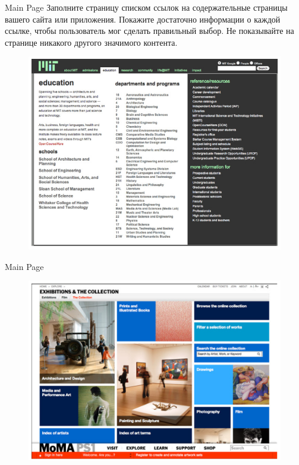 \documentclass{beamer}
\begin{document}
\begin{frame}[t]{Main Page}
	Заполните страницу списком ссылок на содержательные страницы вашего сайта или приложения. Покажите достаточно информации о каждой ссылке, чтобы пользователь мог сделать правильный выбор. Не показывайте на странице никакого другого значимого
контента. 
	\begin{figure}[h]
		\centering
		\includegraphics[scale=0.5]{images/lec07-pic26.png}
	\end{figure}
\end{frame}

\begin{frame}[t]{Main Page}
	\begin{figure}[h]
		\centering
		\includegraphics[scale=0.5]{images/lec07-pic27.png}
	\end{figure}
\end{frame}
\end{document}
